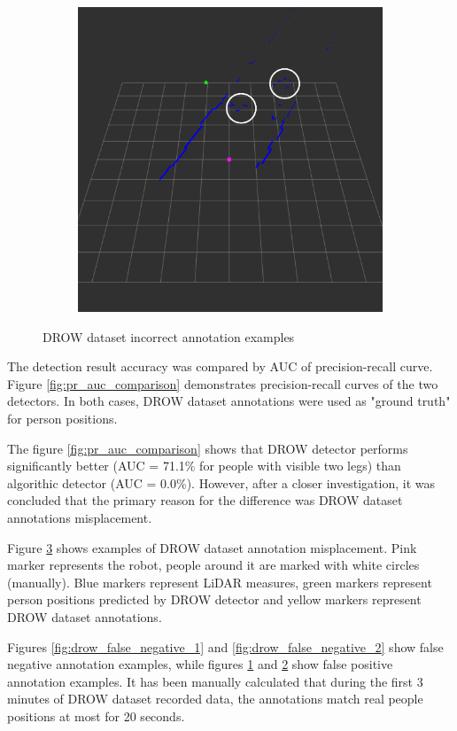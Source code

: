 \documentclass{article}
\begin{document}
\begin{figure}[t]
\begin{subfigure}{.5\textwidth}
		\caption{}
		\label{fig:drow_false_positive_1}
	\end{subfigure}%
	\begin{subfigure}{.5\linewidth}
		\centering
		\includegraphics[width=.65\linewidth, height=.65\linewidth]{ftd_false_positive_2}
		\caption{}
		\label{fig:drow_false_positive_2}
	\end{subfigure}
	\caption{DROW dataset incorrect annotation examples}
	\label{fig:drow_annotation_errors}
\end{figure}

The detection result accuracy was compared by AUC of precision-recall curve\cite{prec_rec_curve}.
Figure \ref{fig:pr_auc_comparison} demonstrates precision-recall curves of the two detectors.
In both cases, DROW dataset annotations were used as "ground truth" for person positions.

The figure \ref{fig:pr_auc_comparison} shows that DROW detector performs significantly better (AUC = 71.1\% for people with visible two legs) than algorithic detector (AUC = 0.0\%).
However, after a closer investigation, it was concluded that the primary reason for the difference was DROW dataset annotations misplacement.

Figure \ref{fig:drow_annotation_errors} shows examples of DROW dataset annotation misplacement.
Pink marker represents the robot, people around it are marked with white circles (manually).
Blue markers represent LiDAR measures, green markers represent person positions predicted by DROW detector and yellow markers represent DROW dataset annotations.

Figures \ref{fig:drow_false_negative_1} and \ref{fig:drow_false_negative_2} show false negative annotation examples, while figures \ref{fig:drow_false_positive_1} and \ref{fig:drow_false_positive_2} show false positive annotation examples.
It has been manually calculated that during the first 3 minutes of DROW dataset recorded data, the annotations match real people positions at most for 20 seconds.
\end{document}
